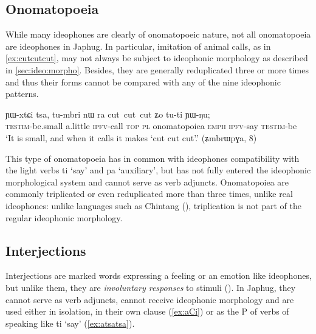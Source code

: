 \documentclass[oldfontcommands,oneside,a4paper,11pt]{article}
\newcommand{\ipa}[1]{{\phon \mbox{#1}}} %
\begin{document}
 \subsection{Onomatopoeia}
While many ideophones are clearly of onomatopoeic nature, not all onomatopoeia are ideophones in Japhug. In particular, imitation of animal calls, as in \ref{ex:cutcutcut}, may not always be subject  to  ideophonic morphology as described in \ref{sec:ideo:morpho}. Besides, they are generally reduplicated three or more times and thus their forms cannot be compared with any of the nine ideophonic patterns.

     \begin{exe}
\ex \label{ex:cutcutcut}
\gll 
 	\ipa{ɲɯ-xtɕi} 	\ipa{tsa,} 	\ipa{tu-mbri} 	\ipa{nɯ} \ipa{ra} 	\ipa{cut cut cut} \ipa{ʑo} 	\ipa{tu-ti} 	\ipa{ɲɯ-ŋu;} \\
\textsc{testim}-be.small a.little \textsc{ipfv}-call \textsc{top} \textsc{pl} onomatopoiea \textsc{emph} \textsc{ipfv}-say \textsc{testim}-be \\
\glt  `It is small, and when it calls it makes `cut cut cut'.' (ʑmbrɯpɣa, 8)
\end{exe}
 
 This type of onomatopoeia has in common with   ideophones   compatibility with the light verbs \ipa{ti} `say' and \ipa{pa} `auxiliary', but has not fully entered the ideophonic morphological system and cannot serve as verb adjuncts. Onomatopoiea are commonly triplicated or even reduplicated more than three times, unlike real ideophones:  unlike languages such as Chintang (\citealt{rai06triplication}), triplication is not part of the regular ideophonic morphology.
 
 \subsection{Interjections}
 
 Interjections are marked words   expressing a feeling or an emotion   like ideophones, but unlike them, they are \textit{involuntary responses} to stimuli   (\citealt{dingemanse11phd}). In Japhug, they cannot serve as verb adjuncts, cannot receive ideophonic morphology and are used either in isolation, in their own clause (\ref{ex:aCi}) or as the P of verbs of speaking like \ipa{ti} `say' (\ref{ex:atsatsa}). 
\end{document}
